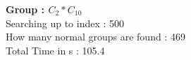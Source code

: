 \textbf{Group : $C_2*C_{10}$}\\
Searching up to index : 500\\
How many normal groups are found : 469\\
Total Time in s : 105.4\\
